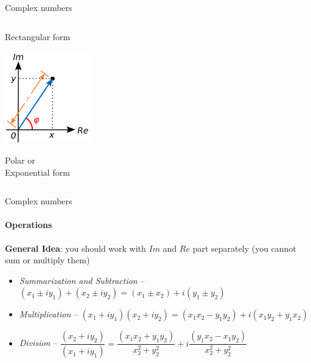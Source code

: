 \documentclass[aspectratio=169]{beamer}
\begin{document}
\begin{frame}[t]{Complex numbers}
\begin{columns}[T,onlytextwidth]
\begin{column}{0.44\textwidth}
\begin{minipage}{0.58\textwidth}
            \end{minipage}\hfill
            \begin{minipage}{0.40\textwidth}
                Rectangular form
                \label{fig:rectangular_form.png}
            \end{minipage}
            \vspace{-0.5cm}
            \begin{minipage}{0.58\textwidth}
                \centering\includegraphics[height=4cm,width=\textwidth,keepaspectratio]{polar_form.png}
            \end{minipage}\hfill
            \begin{minipage}{0.40\textwidth}
                Polar or \\ Exponential form
                \label{fig:polar_form.png}
            \end{minipage}
        \end{column}
    \end{columns}
\end{frame}

\begin{frame}[t]{Complex numbers}
    \framesubtitle{Operations}
    \textbf{General Idea}: you should work with $Im$ and $Re$ part separately (you cannot sum or multiply them) \\
    \begin{itemize}
        \item \textit{Summarization and Subtraction} -- $(x_1 \pm iy_1) + (x_2 \pm iy_2) = (x_1 \pm x_2) + i(y_1\pm y_2)$
        \item \textit{Multiplication} -- $(x_1 + iy_1)(x_2 + iy_2) = (x_1x_2 - y_1y_2) + i(x_1y_2 + y_1x_2)$
        \item \textit{Division} -- $\dfrac{(x_2 + iy_2)}{(x_1 + iy_1)} = \dfrac{(x_1x_2 + y_1y_2)}{x_2^2 + y_2^2} + i\dfrac{(y_1x_2 - x_1y_2)}{x_2^2 + y_2^2} $
    \end{itemize}
\end{frame}
\end{document}
